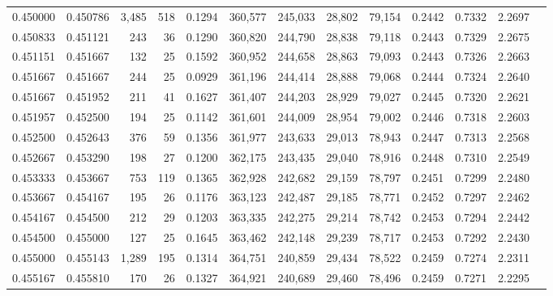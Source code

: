 \begin{tabular}{rrrrrrrrrrrrr}
0.450000 & 0.450786 & 3,485 & 518 &                                     0.1294 & 360,577 & 245,033 &  28,802 &  79,154 & 0.2442 & 0.7332 & 2.2697 \\
0.450833 & 0.451121 &   243 &  36 &                                     0.1290 & 360,820 & 244,790 &  28,838 &  79,118 & 0.2443 & 0.7329 & 2.2675 \\
0.451151 & 0.451667 &   132 &  25 &                                     0.1592 & 360,952 & 244,658 &  28,863 &  79,093 & 0.2443 & 0.7326 & 2.2663 \\
0.451667 & 0.451667 &   244 &  25 &                                     0.0929 & 361,196 & 244,414 &  28,888 &  79,068 & 0.2444 & 0.7324 & 2.2640 \\
0.451667 & 0.451952 &   211 &  41 &                                     0.1627 & 361,407 & 244,203 &  28,929 &  79,027 & 0.2445 & 0.7320 & 2.2621 \\
0.451957 & 0.452500 &   194 &  25 &                                     0.1142 & 361,601 & 244,009 &  28,954 &  79,002 & 0.2446 & 0.7318 & 2.2603 \\
0.452500 & 0.452643 &   376 &  59 &                                     0.1356 & 361,977 & 243,633 &  29,013 &  78,943 & 0.2447 & 0.7313 & 2.2568 \\
0.452667 & 0.453290 &   198 &  27 &                                     0.1200 & 362,175 & 243,435 &  29,040 &  78,916 & 0.2448 & 0.7310 & 2.2549 \\
0.453333 & 0.453667 &   753 & 119 &                                     0.1365 & 362,928 & 242,682 &  29,159 &  78,797 & 0.2451 & 0.7299 & 2.2480 \\
0.453667 & 0.454167 &   195 &  26 &                                     0.1176 & 363,123 & 242,487 &  29,185 &  78,771 & 0.2452 & 0.7297 & 2.2462 \\
0.454167 & 0.454500 &   212 &  29 &                                     0.1203 & 363,335 & 242,275 &  29,214 &  78,742 & 0.2453 & 0.7294 & 2.2442 \\
0.454500 & 0.455000 &   127 &  25 &                                     0.1645 & 363,462 & 242,148 &  29,239 &  78,717 & 0.2453 & 0.7292 & 2.2430 \\
0.455000 & 0.455143 & 1,289 & 195 &                                     0.1314 & 364,751 & 240,859 &  29,434 &  78,522 & 0.2459 & 0.7274 & 2.2311 \\
0.455167 & 0.455810 &   170 &  26 &                                     0.1327 & 364,921 & 240,689 &  29,460 &  78,496 & 0.2459 & 0.7271 & 2.2295 \\

\end{tabular}
